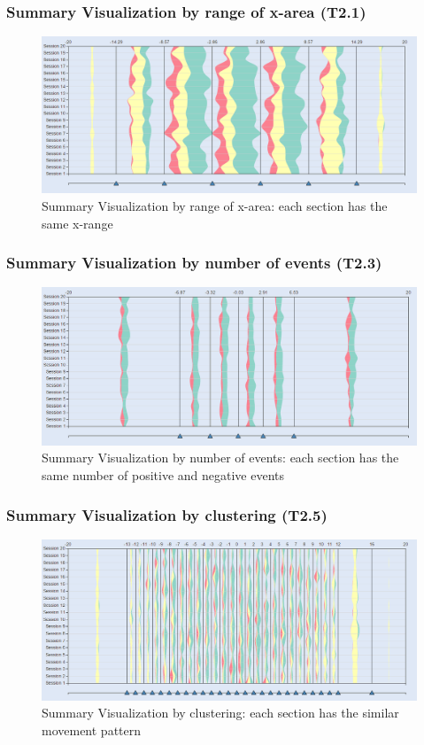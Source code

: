 \documentclass[xcolor=table]{beamer}
\begin{document}
\begin{frame}
\frametitle{Summary Visualization by range of x-area (T2.1)}
\begin{figure}
\includegraphics[scale=0.35]{images/summary_type1.png}
\caption{Summary Visualization by range of x-area: each section has the same x-range}
\end{figure}
\end{frame}
\begin{frame}
\frametitle{Summary Visualization by number of events (T2.3)}
\begin{figure}
\includegraphics[scale=0.35]{images/summary_type2.png}
\caption{Summary Visualization by number of events: each section has the same number of positive and negative events}
\end{figure}
\end{frame}
\begin{frame}
\frametitle{Summary Visualization by clustering (T2.5)}
\begin{figure}
\includegraphics[scale=0.35]{images/summary_clustered.png}
\caption{Summary Visualization by clustering: each section has the similar movement pattern}
\end{figure}
\end{frame}
\end{document}
